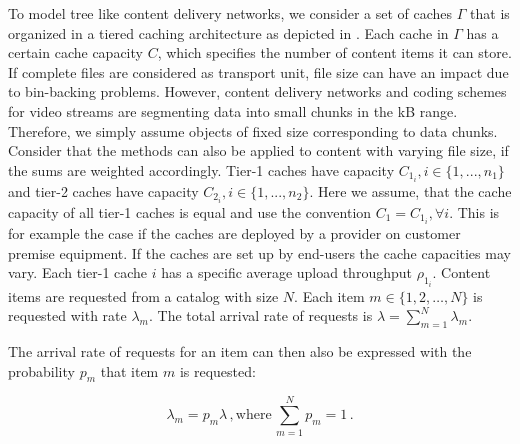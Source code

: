 To model tree like content delivery networks, we consider a set of caches $\Gamma$ that is organized in a tiered caching architecture as depicted in . Each cache in $\Gamma$ has a certain cache capacity $C$, which specifies the number of content items it can store.
If complete files are considered as transport unit, file size can have an impact due to bin-backing problems.
However, content delivery networks and coding schemes for video streams are segmenting data into small chunks in the kB range.
Therefore, we simply assume objects of fixed size corresponding to data chunks.
Consider that the methods can also be applied to content with varying file size, if the sums are weighted accordingly.
Tier-1 caches have capacity $C_{1_i}, i\in\{1,...,n_1\}$ and tier-2 caches have capacity $C_{2_i}, i\in\{1,...,n_2\}$.
Here we assume, that the cache capacity of all tier-1 caches is equal and use the convention $C_1=C_{1_i}, \forall i$.
This is for example the case if the caches are deployed by a provider on customer premise equipment.
If the caches are set up by end-users the cache capacities may vary.
Each tier-1 cache $i$ has a specific average upload throughput $\rho_{1_i}$.
Content items are requested from a catalog with size $N$.
Each item $m\in \{1,2,\dots,N\}$ is requested with rate $\lambda_m$.
The total arrival rate of requests is $\lambda=\sum_{m=1}^N \lambda_m$.

The arrival rate of requests for an item can then also be expressed with the probability $p_m$ that item $m$ is requested:

\begin{equation}
\lambda_m = p_m \lambda \, , \text{where} \, \sum_{m=1}^N p_m = 1 \, .
\end{equation}



